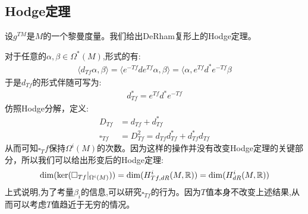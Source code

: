 \subsection{Hodge定理}
设$g^{TM}$是$M$的一个黎曼度量。我们给出DeRham复形上的Hodge定理。
\begin{theorem}[Hodge]
	
\end{theorem}
对于任意的$\alpha,\beta \in \Omega^*(M)$,形式的有:
\begin{align*}
	\langle d_{Tf}\alpha,\beta\rangle=\langle e^{-Tf}de^{Tf}\alpha,\beta\rangle=\langle \alpha,e^{Tf}d^*e^{-Tf}\beta
\end{align*}
于是$d_{Tf}$的形式伴随可写为:
\begin{align}
	d_{Tf}^*=e^{Tf}d^*e^{-Tf}
\end{align}
仿照Hodge分解，定义:
\begin{align}
	D_{Tf}&=d_{Tf}+d^*_{Tf}\\
	\square_{Tf}&=D_{Tf}^2=d_{Tf}d^*_{Tf}+d_{Tf}^*d_{Tf}
\end{align}
从而可知$\square_Tf$保持$\Omega^i(M)$的次数。因为这样的操作并没有改变Hodge定理的关键部分，所以我们可以给出形变后的Hodge定理:
\begin{align}
	\mathrm{dim}(\ker(\square_{Tf}|_{\Omega^i(M)}))=\mathrm{dim}(H^i_{Tf,dR}(M,\mathbb{R}))=\mathrm{dim}(H^i_{dR}(M,\mathbb{R}))
\end{align}
上式说明,为了考量$\beta_i$的信息,可以研究$\square_{Tf}$的行为。因为$T$值本身不改变上述结果,从而可以考虑$T$值趋近于无穷的情况。
